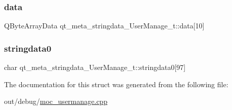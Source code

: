 \subsubsection{\texorpdfstring{data}{data}}
{\footnotesize\ttfamily Q\+Byte\+Array\+Data qt\+\_\+meta\+\_\+stringdata\+\_\+\+User\+Manage\+\_\+t\+::data\mbox{[}10\mbox{]}}

\mbox{\label{structqt__meta__stringdata___user_manage__t_aa319f7f2d82ad1b5760b67e7ba1f20b0}} 
\subsubsection{\texorpdfstring{stringdata0}{stringdata0}}
{\footnotesize\ttfamily char qt\+\_\+meta\+\_\+stringdata\+\_\+\+User\+Manage\+\_\+t\+::stringdata0\mbox{[}97\mbox{]}}



The documentation for this struct was generated from the following file\+:\begin{DoxyCompactItemize}
\item 
out/debug/\mbox{\hyperlink{moc__usermanage_8cpp}{moc\+\_\+usermanage.\+cpp}}\end{DoxyCompactItemize}
